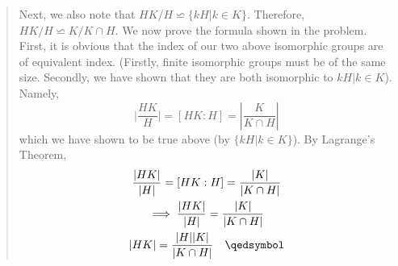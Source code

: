 \documentclass{article}
\begin{document}
\begin{enumerate}
\begin{quote}
                Next, we also note that $HK/H \backsimeq \{kH \vert k \in K\}$. Therefore, $HK/H \backsimeq K/K \cap H$.
                We now prove the formula shown in the problem. First, it is obvious that the index of our two above
                isomorphic groups are of equivalent index. (Firstly, finite isomorphic groups must be of the same size. 
                Secondly, we have shown that they are both isomorphic to ${kH \vert k \in K}$). Namely, 
                \begin{equation*}
                    \vert\frac{HK}{H}\vert = [HK : H] = |\frac{K}{K \cap H}|
                \end{equation*}
                which we have shown to be true above (by $\{kH \vert k \in K\}$). By Lagrange's Theorem, 
                \begin{equation*}
                    \begin{gathered}
                        \frac{|HK|}{|H|} = [HK : H] = \frac{|K|}{|K \cap H|} \\
                        \implies \frac{|HK|}{|H|} = \frac{|K|}{|K \cap H|} \\
                        |HK| =  \frac{|H||K|}{|K \cap H|} \quad\qedsymbol
                    \end{gathered}
                \end{equation*}


\end{quote}
\end{enumerate}
\end{document}
